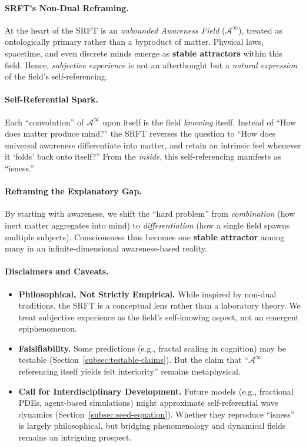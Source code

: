 \documentclass[12pt,a4paper]{article}
\begin{document}
\paragraph{SRFT’s Non-Dual Reframing.}
At the heart of the SRFT is an \emph{unbounded Awareness Field} (\(\mathscr{A}^\infty\)), 
treated as ontologically primary rather than a byproduct of matter. Physical laws, spacetime, 
and even discrete minds emerge as \textbf{stable attractors} within this field. 
Hence, \emph{subjective experience} is not an afterthought but a \emph{natural expression} 
of the field’s self-referencing.

\paragraph{Self-Referential Spark.}
Each “convolution” of \(\mathscr{A}^\infty\) upon itself is the field \emph{knowing} itself. 
Instead of “How does matter produce mind?” the SRFT reverses the question to “How does universal 
awareness differentiate into matter, and retain an intrinsic feel whenever it ‘folds’ back 
onto itself?” From the \emph{inside}, this self-referencing manifests as “isness.”

\paragraph{Reframing the Explanatory Gap.}
By starting with awareness, we shift the “hard problem” from \emph{combination} (how inert matter 
aggregates into mind) to \emph{differentiation} (how a single field spawns multiple subjects). 
Consciousness thus becomes one \textbf{stable attractor} among many in an infinite-dimensional 
awareness-based reality.

\paragraph{Disclaimers and Caveats.}
\begin{itemize}
    \item \textbf{Philosophical, Not Strictly Empirical.} 
    While inspired by non-dual traditions, the SRFT is a conceptual lens rather than a laboratory theory. 
    We treat subjective experience as the field’s self-knowing aspect, not an emergent epiphenomenon.

    \item \textbf{Falsifiability.}
    Some predictions (e.g., fractal scaling in cognition) may be testable (Section~\ref{subsec:testable-claims}). 
    But the claim that “\(\mathscr{A}^\infty\) referencing itself yields felt interiority” remains metaphysical.

    \item \textbf{Call for Interdisciplinary Development.}
    Future models (e.g., fractional PDEs, agent-based simulations) might approximate self-referential wave dynamics 
    (Section~\ref{subsec:seed-equation}). Whether they reproduce “isness” is largely philosophical, 
    but bridging phenomenology and dynamical fields remains an intriguing prospect.
\end{itemize}
\end{document}

